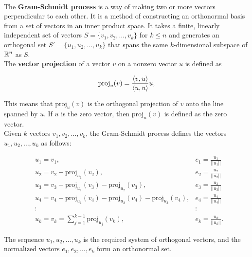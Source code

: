 \begin{definition}
	\hfill\\
	The \textbf{Gram-Schmidt process} is a way of making two or more vectors perpendicular to each other. It is a method of constructing an orthonormal basis from a set of vectors in an inner product space. It takes a finite, linearly independent set of vectors $S = \{v_1, v_2, \dots, v_k\}$ for $k \leq n$ and generates an orthogonal set $S' = \{u_1, u_2, \dots, u_k\}$ that spans the same $k$-dimensional subspace of $\mathbb{R}^n$ as $S$.\\

	The \textbf{vector projection} of a vector $v$ on a nonzero vector $u$ is defined as

	\[\text{proj}_u(v) = \frac{\langle v,u\rangle}{\langle u,u\rangle}u,\]

	This means that $\text{proj}_u(v)$ is the orthogonal projection of $v$ onto the line spanned by $u$. If $u$ is the zero vector, then $\text{proj}_u(v)$ is defined as the zero vector.\\

	Given $k$ vectors $v_1, v_2, \dots, v_k$, the Gram-Schmidt process defines the vectors $u_1, u_2, \dots, u_k$ as follows:

	\[\begin{aligned}
			 & u_1 = v_1,                                                                            & e_1 = \frac{u_1}{||u_1||}  \\
			 & u_2 = v_2 - \text{proj}_{u_1}(v_2),                                                   & e_2 = \frac{u_2}{||u_2||}  \\
			 & u_3 = v_3 - \text{proj}_{u_1}(v_3) - \text{proj}_{u_2}(v_3),                          & e_3 = \frac{u_3}{||u_3||}  \\
			 & u_4 = v_4 - \text{proj}_{u_1}(v_4) - \text{proj}_{u_2}(v_4) - \text{proj}_{u_3}(v_4), & e_4 = \frac{u_4}{||u_4||}  \\
			 & \vdots                                                                                & \vdots                     \\
			 & u_k = v_k = \sum_{j=1}^{k-1}\text{proj}_{u_j}(v_k),                                   & e_k = \frac{u_k}{||u_k||}.
		\end{aligned}\]

	The sequence $u_1, u_2, \dots, u_k$ is the required system of orthogonal vectors, and the normalized vectors $e_1, e_2, \dots, e_k$ form an orthonormal set.
\end{definition}

